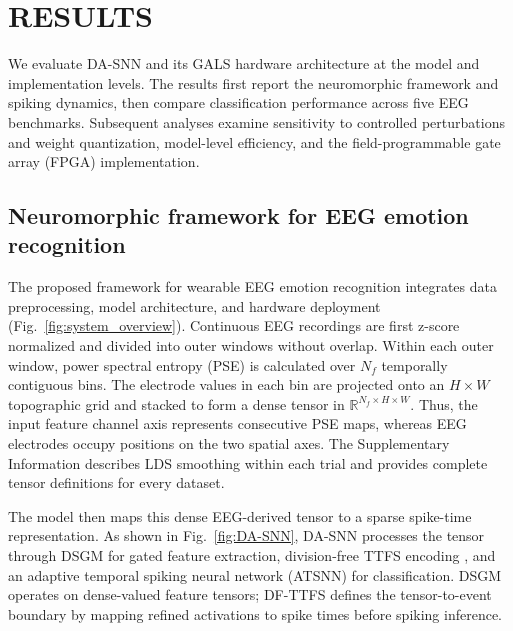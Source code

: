 \documentclass{nsr}
\begin{document}
\section{RESULTS}
We evaluate DA-SNN and its GALS hardware architecture at the model and implementation levels. The results first report the neuromorphic framework and spiking dynamics, then compare classification performance across five EEG benchmarks. Subsequent analyses examine sensitivity to controlled perturbations and weight quantization, model-level efficiency, and the field-programmable gate array (FPGA) implementation.


\subsection{Neuromorphic framework for EEG emotion recognition}

The proposed framework for wearable EEG emotion recognition integrates data preprocessing, model architecture, and hardware deployment (Fig.~\ref{fig:system_overview}). Continuous EEG recordings are first z-score normalized and divided into outer windows without overlap. Within each outer window, power spectral entropy (PSE) is calculated over $N_f$ temporally contiguous bins. The electrode values in each bin are projected onto an $H\times W$ topographic grid and stacked to form a dense tensor in $\mathbb{R}^{N_f\times H\times W}$. Thus, the input feature channel axis represents consecutive PSE maps, whereas EEG electrodes occupy positions on the two spatial axes. The Supplementary Information describes LDS smoothing within each trial and provides complete tensor definitions for every dataset.

The model then maps this dense EEG-derived tensor to a sparse spike-time representation. As shown in Fig.~\ref{fig:DA-SNN}, DA-SNN processes the tensor through DSGM for gated feature extraction, division-free TTFS encoding \cite{TTFS}, and an adaptive temporal spiking neural network (ATSNN) for classification. DSGM operates on dense-valued feature tensors; DF-TTFS defines the tensor-to-event boundary by mapping refined activations to spike times before spiking inference.
\end{document}
